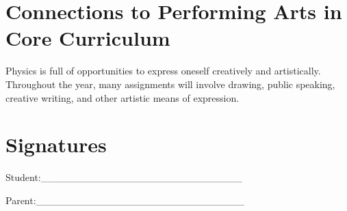 \documentclass[11pt]{article}
\begin{document}
\section{Connections to Performing Arts in Core Curriculum}
\label{sec:org09c268c}
Physics is full of opportunities to express oneself creatively and artistically. Throughout the year, many assignments will involve drawing, public speaking, creative writing, and other artistic means of expression.

\section{Signatures}
\label{sec:orgffec6a9}

Student:\_\_\_\_\_\_\_\_\_\_\_\_\_\_\_\_\_\_\_\_\_\_\_\_\_\_\_\_


Parent:\_\_\_\_\_\_\_\_\_\_\_\_\_\_\_\_\_\_\_\_\_\_\_\_\_\_\_\_\_
\end{document}
